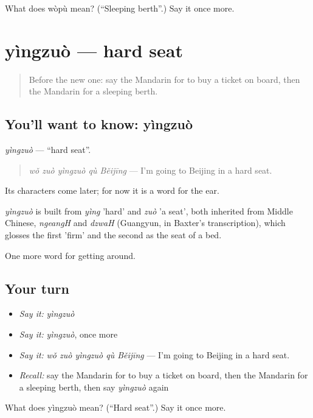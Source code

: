 \begin{tcolorbox}[breakable,colback=teal!4,colframe=teal!35!black,title={Before you move on}]
What does wòpù mean? (\textquotedblleft{}Sleeping berth\textquotedblright{}.) Say it once more.
\end{tcolorbox}
\section[yìngzuò]{yìngzuò — hard seat}

\label{lesson:ZH-C404-yingzuo}



\begin{quote}
Before the new one: say the Mandarin for to buy a ticket on board, then the Mandarin for a sleeping berth.
\end{quote}

\subsection*{You'll want to know: yìngzuò}
\emph{yìngzuò} — \textquotedblleft{}hard seat\textquotedblright{}.

\begin{quote}
\emph{wǒ zuò yìngzuò qù Běijīng} — I'm going to Beijing in a hard seat.
\end{quote}

Its characters come later; for now it is a word for the ear.

\begin{cousinweb}
\emph{yìngzuò} is built from \emph{yìng} 'hard' and \emph{zuò} 'a seat', both inherited from Middle Chinese, \emph{ngeangH} and \emph{dzwaH} (Guangyun, in Baxter's transcription), which glosses the first 'firm' and the second as the seat of a bed.
\end{cousinweb}

\begin{grammarlens}[title={What you've built}]
One more word for getting around.
\end{grammarlens}

\subsection*{Your turn}
\begin{itemize}
\raggedright
  \item \emph{Say it:} \emph{yìngzuò}
  \item \emph{Say it:} \emph{yìngzuò}, once more
  \item \emph{Say it:} \emph{wǒ zuò yìngzuò qù Běijīng} — I'm going to Beijing in a hard seat.
  \item \emph{Recall:} say the Mandarin for to buy a ticket on board, then the Mandarin for a sleeping berth, then say \emph{yìngzuò} again
\end{itemize}

\begin{tcolorbox}[breakable,colback=teal!4,colframe=teal!35!black,title={Before you move on}]
What does yìngzuò mean? (\textquotedblleft{}Hard seat\textquotedblright{}.) Say it once more.
\end{tcolorbox}
